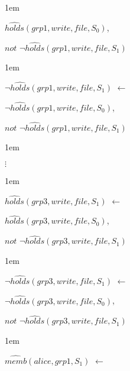 \documentclass[glov2,twocolumn,final]{svjour2}
\newenvironment{vquote}
  {\begin{list}{}{\leftmargin 1em}\item[]}
  {\end{list}}
\begin{document}
\begin{enumerate}
\begin{vquote}
           \hspace{1em}
           $\hat{holds}(grp1, write, file, S_{0})$,

           \hspace{1em}
           $not$ $\lnot\hat{holds}(grp1, write, file, S_{1})$
         \end{vquote}

         \begin{vquote}
           $\lnot\hat{holds}(grp1, write, file, S_{1})$ $\leftarrow$

           \hspace{1em}
           $\lnot\hat{holds}(grp1, write, file, S_{0})$,

           \hspace{1em}
           $not$ $\lnot\hat{holds}(grp1, write, file, S_{1})$
         \end{vquote}

         \begin{vquote}
           \hspace{2em}$\vdots$
         \end{vquote}

         \begin{vquote}
           $\hat{holds}(grp3, write, file, S_{1})$ $\leftarrow$

           \hspace{1em}
           $\hat{holds}(grp3, write, file, S_{0})$,

           \hspace{1em}
           $not$ $\lnot\hat{holds}(grp3, write, file, S_{1})$
         \end{vquote}

         \begin{vquote}
           $\lnot\hat{holds}(grp3, write, file, S_{1})$ $\leftarrow$

           \hspace{1em}
           $\lnot\hat{holds}(grp3, write, file, S_{0})$,

           \hspace{1em}
           $not$ $\lnot\hat{holds}(grp3, write, file, S_{1})$
         \end{vquote}

         \begin{vquote}
           $\hat{memb}(alice, grp1, S_{1})$ $\leftarrow$


\end{vquote}
\end{enumerate}
\end{document}
